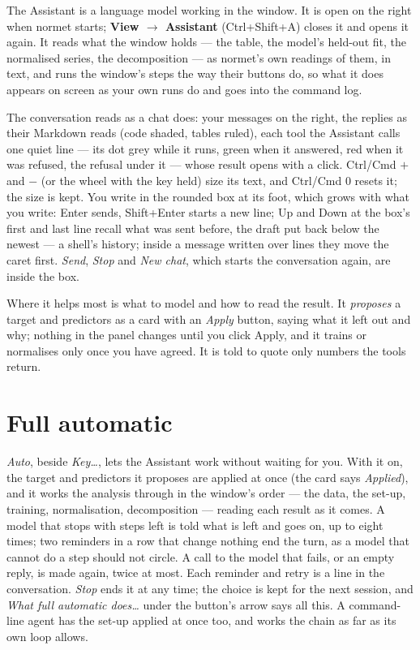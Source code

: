 \documentclass[11pt]{report}
\newcommand{\nm}{\textsf{normet}}
\newcommand{\tab}[1]{\textbf{#1}}
\begin{document}
The Assistant is a language model working in the window. It is open on the right when
\nm{} starts; \tab{View $\rightarrow$ Assistant} (Ctrl+Shift+A) closes it and opens it
again. It reads what the window holds --- the table, the model's held-out fit, the
normalised series, the decomposition --- as \nm{}'s own readings of them, in text, and
runs the window's steps the way their buttons do, so what it does appears on screen as
your own runs do and goes into the command log.

The conversation reads as a chat does: your messages on the right, the replies as their
Markdown reads (code shaded, tables ruled), each tool the Assistant calls one quiet line
--- its dot grey while it runs, green when it answered, red when it was refused, the
refusal under it --- whose result opens with a click. Ctrl/Cmd $+$ and $-$ (or the wheel
with the key held) size its text, and Ctrl/Cmd 0 resets it; the size is kept. You write
in the rounded box at its foot, which grows with what you write: Enter sends, Shift+Enter
starts a new line; Up and Down at the box's first and last line recall what was sent
before, the draft put back below the newest --- a shell's history; inside a message
written over lines they move the caret first. \emph{Send}, \emph{Stop} and \emph{New
chat}, which starts the conversation again, are inside the box.

Where it helps most is what to model and how to read the result. It \emph{proposes} a
target and predictors as a card with an \emph{Apply} button, saying what it left out and
why; nothing in the panel changes until you click Apply, and it trains or normalises only
once you have agreed. It is told to quote only numbers the tools return.

\section{Full automatic}\label{sec:autoassistant}
\emph{Auto}, beside \emph{Key\ldots}, lets the Assistant work without waiting for you.
With it on, the target and predictors it proposes are applied at once (the
card says \emph{Applied}), and it works the analysis through in the window's order ---
the data, the set-up, training, normalisation, decomposition --- reading each result as it
comes. A model that stops with steps left is told what is left and goes on, up to eight
times; two reminders in a row that change nothing end the turn, as a model that cannot do
a step should not circle. A call to the model that fails, or an empty reply, is made again,
twice at most. Each reminder and retry is a line in the conversation. \emph{Stop} ends it
at any time; the choice is kept for the next session, and \emph{What full automatic
does\ldots} under the button's arrow says all this. A command-line agent has the set-up
applied at once too, and works the chain as far as its own loop allows.
\end{document}
